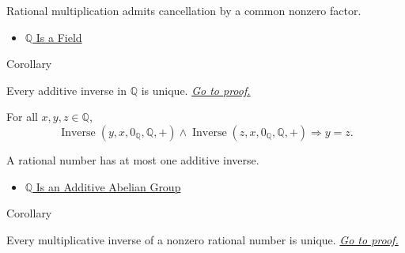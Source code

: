 \begin{remark*}[Interpretation]
Rational multiplication admits cancellation by a common nonzero factor.
\end{remark*}

\begin{dependencies}
\begin{itemize}
  \item \hyperref[thm:q-is-a-field]{$\mathbb{Q}$ Is a Field}
\end{itemize}
\end{dependencies}

\begin{corollarybox}{Corollary}
\begin{corollary}
\label{cor:uniqueness-additive-inverse-on-q}
Every additive inverse in $\mathbb{Q}$ is unique.
\hyperref[prf:uniqueness-additive-inverse-on-q]{\textit{Go to proof.}}
\end{corollary}
\end{corollarybox}

\begin{remark*}
For all $x,y,z\in\mathbb{Q}$,
\[
\operatorname{Inverse}(y,x,0_{\mathbb{Q}},\mathbb{Q},+)
\land
\operatorname{Inverse}(z,x,0_{\mathbb{Q}},\mathbb{Q},+)
\Longrightarrow y=z.
\]
\end{remark*}

\begin{remark*}[Interpretation]
A rational number has at most one additive inverse.
\end{remark*}

\begin{dependencies}
\begin{itemize}
  \item \hyperref[thm:q-additive-abelian-group]{$\mathbb{Q}$ Is an Additive Abelian Group}
\end{itemize}
\end{dependencies}

\begin{corollarybox}{Corollary}
\begin{corollary}
\label{cor:uniqueness-multiplicative-inverse-on-q}
Every multiplicative inverse of a nonzero rational number is unique.
\hyperref[prf:uniqueness-multiplicative-inverse-on-q]{\textit{Go to proof.}}
\end{corollary}
\end{corollarybox}

